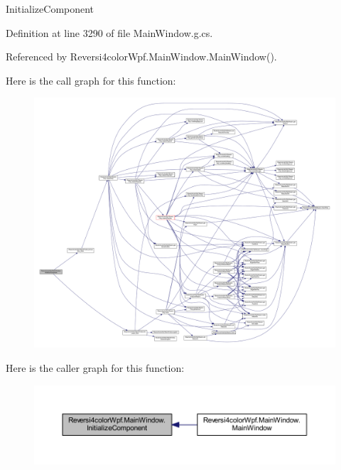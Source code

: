 Initialize\+Component 



Definition at line 3290 of file Main\+Window.\+g.\+cs.



Referenced by Reversi4color\+Wpf.\+Main\+Window.\+Main\+Window().



Here is the call graph for this function\+:
\nopagebreak
\begin{figure}[H]
\begin{center}
\leavevmode
\includegraphics[width=350pt]{class_reversi4color_wpf_1_1_main_window_a20f84946e71f327820f3ccbefca1f3a0_cgraph}
\end{center}
\end{figure}




Here is the caller graph for this function\+:
\nopagebreak
\begin{figure}[H]
\begin{center}
\leavevmode
\includegraphics[width=350pt]{class_reversi4color_wpf_1_1_main_window_a20f84946e71f327820f3ccbefca1f3a0_icgraph}
\end{center}
\end{figure}


